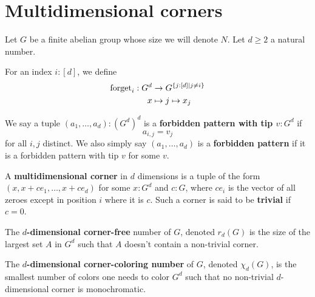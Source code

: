 \chapter{Multidimensional corners}

Let $G$ be a finite abelian group whose size we will denote $N$. Let $d \ge 2$ a natural number.

\begin{definition}
  \label{def:forget}
  \uses{}
  \leanok

  For an index $i : [d]$, we define
  \begin{align}
    \operatorname{forget}_i : G^d & \to G^{\{j : [d] \mid j \ne i\}} \\
    x & \mapsto j \mapsto x_j
  \end{align}
\end{definition}

\begin{definition}
  \label{def:forbidden-pattern}
  \uses{}
  \leanok

  We say a tuple $(a_1, \dots, a_d) : (G^d)^d$ is a {\bf forbidden pattern with tip $v : G^d$} if
  $$a_{i, j} = v_j$$
  for all $i, j$ distinct. We also simply say $(a_1, \dots, a_d)$ is a {\bf forbidden pattern} if it is a forbidden pattern with tip $v$ for some $v$.
\end{definition}

\begin{definition}
  \label{def:multicorner}
  \leanok

  A {\bf multidimensional corner} in $d$ dimensions is a tuple of the form $(x, x + ce_1, \dots, x + ce_d)$ for some $x : G^d$ and $c : G$, where $ce_i$ is the vector of all zeroes except in position $i$ where it is $c$. Such a corner is said to be {\bf trivial} if $c = 0$.
\end{definition}

\begin{definition}
  \label{def:corner-free-num}

  The {\bf $d$-dimensional corner-free} number of $G$, denoted $r_d(G)$ is the size of the largest set $A$ in $G^d$ such that $A$ doesn't contain a non-trivial corner.
\end{definition}

\begin{definition}
  \label{def:corner-color-num}

  The {\bf $d$-dimensional corner-coloring number} of $G$, denoted $\chi_d(G)$, is the smallest number of colors one needs to color $G^d$ such that no non-trivial $d$-dimensional corner is monochromatic.
\end{definition}

